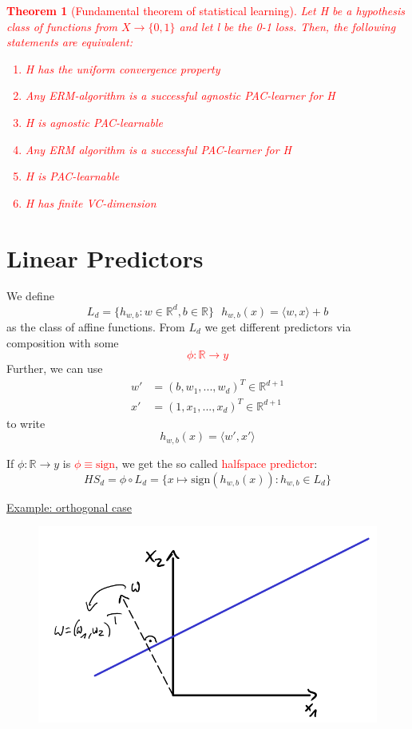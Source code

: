 \documentclass[10pt,a4paper]{article}
\newtheorem{theorem}{Theorem}[section]
\theoremstyle{remark}
\theoremstyle{definition}
\theoremstyle{plain}
\begin{document}
\textcolor{red}{\begin{theorem}[Fundamental theorem of statistical learning] Let H be a hypothesis class of functions from $X \to \{ 0,1 \}$ and let l be the 0-1 loss. Then, the following statements are equivalent:
\begin{enumerate}
	\item H has the uniform convergence property
	\item Any ERM-algorithm is a successful agnostic PAC-learner for H
	\item H is agnostic PAC-learnable
	\item Any ERM algorithm is a successful PAC-learner for H
	\item H is PAC-learnable
	\item H has finite VC-dimension
\end{enumerate}
\end{theorem}}

\newpage
\part{Linear Predictors}
We define 
$$
	L_d = \{ h_{w,b}: w \in \mathbb{R}^d, b \in \mathbb{R}\} \ \ \ h_{w,b}(x) = \langle w,x \rangle + b
$$
as the class of affine functions. From $L_d$ we get different predictors via composition with some 
\textcolor{red}{$$
	\mathcal{\phi}: \mathbb{R} \to y
$$}
Further, we can use
\begin{align*}
	w' &= (b, w_1, ... , w_d)^T \in \mathbb{R}^{d+1}\\
	x' &= (1, x_1, ... , x_d)^T \in \mathbb{R}^{d+1}
\end{align*}
to write 
$$
	h_{w,b} (x) = \langle w', x' \rangle
$$

If $\mathcal{\phi}: \mathbb{R} \to y$ is \textcolor{red}{$\mathcal{\phi} \equiv \text{sign}$}, we get the so called \textcolor{red}{halfspace predictor}:
$$
	HS_d = \mathcal{\phi} \circ L_d = \{ x \mapsto \text{sign}(h_{w,b}(x)): h_{w,b} \in L_d \}
$$

\underline{Example: orthogonal case}
\begin{figure}[H]
	\centering
	\includegraphics[width=0.7\linewidth]{sketch_7}
	\label{fig:sketch7}
\end{figure}
\end{document}

